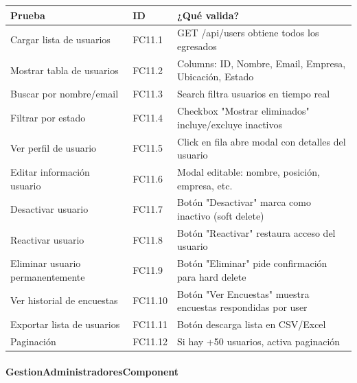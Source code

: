 \begin{table}[H]
\centering
\begin{tabular}{|l|l|p{6cm}|}
\hline
\textbf{Prueba} & \textbf{ID} & \textbf{¿Qué valida?} \\ \hline
Cargar lista de usuarios & FC11.1 & GET /api/users obtiene todos los egresados \\ \hline
Mostrar tabla de usuarios & FC11.2 & Columns: ID, Nombre, Email, Empresa, Ubicación, Estado \\ \hline
Buscar por nombre/email & FC11.3 & Search filtra usuarios en tiempo real \\ \hline
Filtrar por estado & FC11.4 & Checkbox "Mostrar eliminados" incluye/excluye inactivos \\ \hline
Ver perfil de usuario & FC11.5 & Click en fila abre modal con detalles del usuario \\ \hline
Editar información usuario & FC11.6 & Modal editable: nombre, posición, empresa, etc. \\ \hline
Desactivar usuario & FC11.7 & Botón "Desactivar" marca como inactivo (soft delete) \\ \hline
Reactivar usuario & FC11.8 & Botón "Reactivar" restaura acceso del usuario \\ \hline
Eliminar usuario permanentemente & FC11.9 & Botón "Eliminar" pide confirmación para hard delete \\ \hline
Ver historial de encuestas & FC11.10 & Botón "Ver Encuestas" muestra encuestas respondidas por user \\ \hline
Exportar lista de usuarios & FC11.11 & Botón descarga lista en CSV/Excel \\ \hline
Paginación & FC11.12 & Si hay +50 usuarios, activa paginación \\ \hline
\end{tabular}
\end{table}

\paragraph{GestionAdministradoresComponent}

